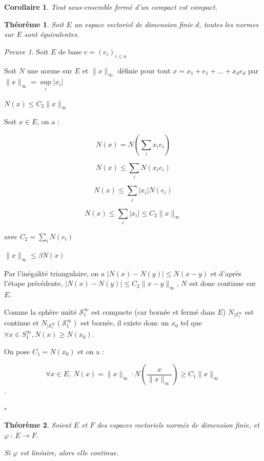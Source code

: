 \documentclass[]{article}
\newtheorem{mythm}{Théorème}
\newtheorem{mycor}{Corollaire}
\theoremstyle{remark}
\newtheorem{myproof}{Preuve}
\theoremstyle{definition}
\newcommand{\cqfd}{
	\hfill$\square$
}
\newcommand{\funcshort}[3]{
#1 ~ : ~ #2 \longrightarrow #3
}
\newenvironment{proofpart}[1]{
	\leavevmode
	
	\noindent
	{\textit{\textbf{\boldmath #1}}}
	
}{
	\checkmark
}
\begin{document}
\begin{mycor}
	Tout sous-ensemble fermé d'un compact est compact.
\end{mycor}

\begin{mythm}
	Soit $E$ un espace vectoriel de dimension finie $d$, toutes les normes sur $E$ sont équivalentes.
\end{mythm}

\begin{myproof}
	Soit $E$ de base $e=(e_i)_{i \leqslant n}$
	
	Soit $N$ une norme sur $E$ et $\|x\|_{\infty}$ définie pour tout $x=x_1 +e_1 + ... + x_d e_d$ par $\|x\|_{\infty} = \sup\limits_i |x_i|$
	
	\begin{proofpart}{$N(x) \leqslant C_2 \|x\|_\infty$}
		Soit $x \in E$, on a :
		
		$$N(x) = N\left(\sum_{i} x_i e_i\right)$$

		$$N(x) \leqslant \sum_{i} N(x_i e_i)$$

		$$N(x) \leqslant \sum_{i} |x_i| N(e_i)$$

		$$N(x) \leqslant \sum_{i} |x_i| \leqslant C_2 \|x\|_{\infty}$$
		
		avec $C_2 = \sum_i N(e_i)$
	\end{proofpart}
	
	\begin{proofpart}{$\|x\|_\infty \leqslant \beta N(x)$}
		Par l'inégalité triangulaire, on a $|N(x)-N(y)| \leqslant N(x-y)$ et d'après l'étape précédente, $|N(x) - N(y)| \leqslant C_2 \|x-y\|_{\infty}$, $N$ est donc continue sur $E$.
		
		Comme la sphère unité $\mathcal{S}_1^{\infty}$ est compacte (car bornée et fermé dans $E$) $N_{|\mathcal{S}_1^{\infty}}$ est continue et $N_{|\mathcal{S}_1^{\infty}}(\mathcal{S}_1^{\infty})$ est bornée, il existe donc un $x_0$ tel que $\forall x \in S^{\infty}_1, N(x) \geqslant N(x_0)$.
		
		On pose $C_1=N(x_0)$ et on a :
		
		$$\forall x \in E, ~ N(x) = \|x\|_{\infty} \cdot  N\left(\frac{x}{\|x\|_{\infty}}\right) \geqslant C_1 \|x\|_{\infty}$$.
	\end{proofpart}
	
	\cqfd
\end{myproof}

\begin{mythm}
	Soient $E$ et $F$ des espaces vectoriels normés de dimension finie, et $\funcshort{\varphi}{E}{F}$.
	
	Si $\varphi$ est linéaire, alors elle continue.
\end{mythm}
\end{document}
